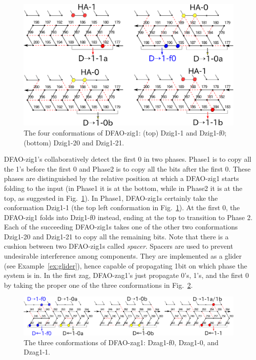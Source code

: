 \begin{figure}
\centering
\includegraphics[width=\linewidth]{pic/DFAO-zig1.png}  
  \caption{The four conformations of DFAO-zig1: (top) Dzig1-1 and Dzig1-f0; (bottom) Dzig1-20 and Dzig1-21.}
  \label{fig:DFAO-zig1}
\end{figure}

DFAO-zig1's collaboratively detect the first 0 in two phases.
Phase1 is to copy all the 1's before the first 0 and Phase2 is to copy all the bits after the first 0.
These phases are distinguished by the relative position at which a DFAO-zig1 starts folding to the input (in Phase1 it is at the bottom, while in Phase2 it is at the top, as suggested in Fig.~\ref{fig:DFAO-zig1}).
In Phase1, DFAO-zig1s certainly take the conformation Dzig1-1 (the top left conformation in Fig.~\ref{fig:DFAO-zig1}).
At the first
 0, the DFAO-zig1 folds into Dzig1-f0 instead, ending at the top to transition to Phase 2.
Each of the succeeding DFAO-zig1s takes one of the other two conformations Dzig1-20 and Dzig1-21 to copy all the remaining bits. 
Note that there is a cushion between two DFAO-zig1s called \textit{spacer}.
Spacers are used to prevent undesirable interference among components.
They are implemented as a glider (see Example~\ref{ex:glider}), hence capable of propagating 1bit on which phase the system is in.
In the first zag, DFAO-zag1's just propagate 0's, 1's, and the first 0 by taking the proper one of the three conformations in Fig.~\ref{fig:DFAO-zag1}.

\begin{figure}[tb]
  \includegraphics[width=\linewidth]{pic/DFAO-zag1.png}
  \caption{The three conformations of DFAO-zag1: Dzag1-f0, Dzag1-0, and Dzag1-1.}
  \label{fig:DFAO-zag1}
\end{figure} 



